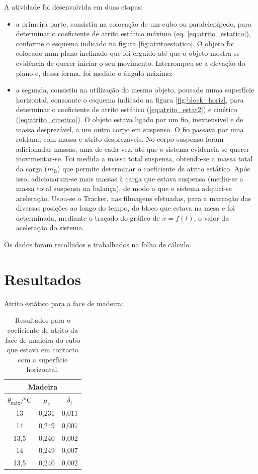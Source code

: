 \documentclass{article}
\begin{document}
	A atividade foi desenvolvida em duas etapas: 
	\begin{itemize}
		\item a primeira parte, consistiu na colocação de um cubo ou paralelepípedo, para determinar o coeficiente de atrito estático máximo (eq. \ref{eq:atrito_estatico}), conforme o esquema indicado na figura \ref{fig:atritoestatico}. O objeto foi colocado num plano inclinado que foi erguido até que o objeto mostra-se evidência de querer iniciar o seu movimento. Interrompeu-se a elevação do plano e, dessa forma, foi medido o ângulo máximo;
		\item a segunda, consistiu na utilização do mesmo objeto, pousado numa superfície horizontal, consoante o esquema indicado na figura \ref{fig:block_horiz}, para determinar o coeficiente de atrito estático (\ref{eq:atrito_estat2}) e cinético (\ref{eq:atrito_cinetico}). O objeto estava ligado por um fio, inextensível e de massa desprezável, a um outro corpo em suspenso. O fio passava por uma roldana, com massa e atrito desprezáveis. No corpo suspenso foram adicionadas massas, uma de cada vez, até que o sistema evidencia-se querer movimentar-se. Foi medida a massa total suspensa, obtendo-se a massa total da carga ($m_\text{B}$) que permite determinar o coeficiente de atrito estático. Após isso, adicionaram-se mais massas à carga que estava suspensa (mediu-se a massa total suspensa na balança), de modo a que o sistema adquiri-se aceleração. Usou-se o Tracker, nas filmagens efetuadas, para a marcação das diversas posições ao longo do tempo, do bloco que estava na mesa e foi determinada, mediante o traçado do gráfico de $x=f(t)$, o valor da aceleração do sistema.
	\end{itemize}	
	
	Os dados foram recolhidos e trabalhados na folha de cálculo.
	
	\section*{Resultados}
	
	Atrito estático para a face de madeira:
	\begin{table}[H]
		\centering
		\begin{tabular}{|c|c|c|}
			\hline
			\multicolumn{3}{c}{Madeira} \\
			\hline
			$\theta_\text{máx}/\unit{\celsius}$ & $\mu_e$ & $\delta_i$ \\
			\hline
			13 & 0,231 & 0,011 \\
			\hline
			14 & 0,249 & 0,007 \\
			\hline
			13,5 & 0,240 & 0,002 \\
			\hline
			14 & 0,249 & 0,007 \\
			\hline
			13,5 & 0,240 & 0,002 \\
			\hline
		\end{tabular}
		\caption{Resultados para o coeficiente de atrito da face de madeira do cubo que estava em contacto com a superfície horizontal.}
		\label{tab:atrito_estatico}
	\end{table}
	
\end{document}
